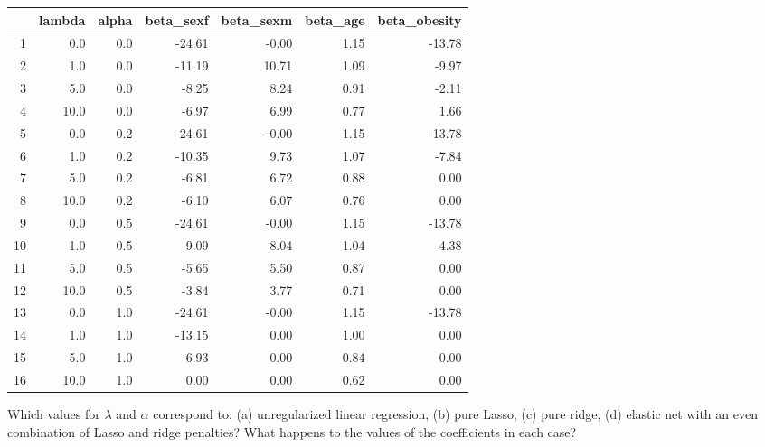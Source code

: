 {\small
\begin{center}
\begin{tabular}{rrrrrrr}
  \toprule
 & lambda & alpha & beta\_sexf & beta\_sexm & beta\_age & beta\_obesity \\ 
  \midrule
1 & 0.0 & 0.0 & -24.61 & -0.00 & 1.15 & -13.78 \\ 
  2 & 1.0 & 0.0 & -11.19 & 10.71 & 1.09 & -9.97 \\ 
  3 & 5.0 & 0.0 & -8.25 & 8.24 & 0.91 & -2.11 \\ 
  4 & 10.0 & 0.0 & -6.97 & 6.99 & 0.77 & 1.66 \\ 
  5 & 0.0 & 0.2 & -24.61 & -0.00 & 1.15 & -13.78 \\ 
  6 & 1.0 & 0.2 & -10.35 & 9.73 & 1.07 & -7.84 \\ 
  7 & 5.0 & 0.2 & -6.81 & 6.72 & 0.88 & 0.00 \\ 
  8 & 10.0 & 0.2 & -6.10 & 6.07 & 0.76 & 0.00 \\ 
  9 & 0.0 & 0.5 & -24.61 & -0.00 & 1.15 & -13.78 \\ 
  10 & 1.0 & 0.5 & -9.09 & 8.04 & 1.04 & -4.38 \\ 
  11 & 5.0 & 0.5 & -5.65 & 5.50 & 0.87 & 0.00 \\ 
  12 & 10.0 & 0.5 & -3.84 & 3.77 & 0.71 & 0.00 \\ 
  13 & 0.0 & 1.0 & -24.61 & -0.00 & 1.15 & -13.78 \\ 
  14 & 1.0 & 1.0 & -13.15 & 0.00 & 1.00 & 0.00 \\ 
  15 & 5.0 & 1.0 & -6.93 & 0.00 & 0.84 & 0.00 \\ 
  16 & 10.0 & 1.0 & 0.00 & 0.00 & 0.62 & 0.00 \\ 
   \bottomrule
\end{tabular}
\end{center}
}

\begin{question}{}
Which values for $\lambda$ and $\alpha$ correspond to: (a) unregularized linear regression, (b) pure Lasso, (c) pure ridge, (d) elastic net with an even combination of Lasso and ridge penalties? What happens to the values of the coefficients in each case?
\end{question}


